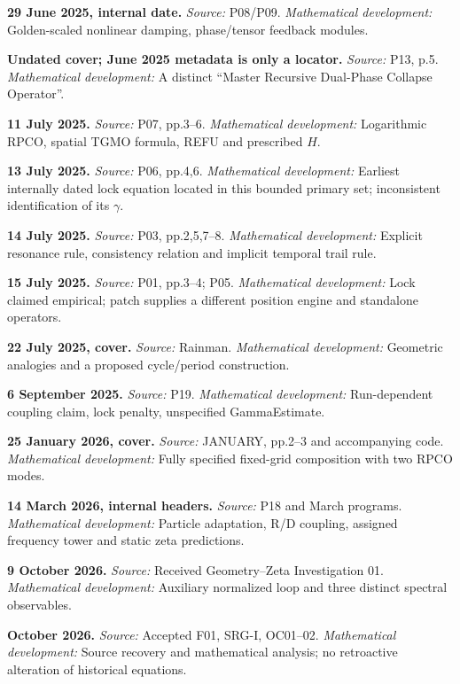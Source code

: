 \documentclass[11pt,a4paper]{article}
\begin{document}
\par\smallskip\noindent\textbf{29 June 2025, internal date.} 
\textit{Source:} P08/P09. \textit{Mathematical development:} Golden-scaled nonlinear damping, phase/tensor feedback modules.
\par\smallskip\noindent\textbf{Undated cover; June 2025 metadata is only a locator.} 
\textit{Source:} P13, p.5. \textit{Mathematical development:} A distinct ``Master Recursive Dual-Phase Collapse Operator''.
\par\smallskip\noindent\textbf{11 July 2025.} 
\textit{Source:} P07, pp.3--6. \textit{Mathematical development:} Logarithmic RPCO, spatial TGMO formula, REFU and prescribed $H$.
\par\smallskip\noindent\textbf{13 July 2025.} 
\textit{Source:} P06, pp.4,6. \textit{Mathematical development:} Earliest internally dated lock equation located in this bounded primary set; inconsistent identification of its $\gamma$.
\par\smallskip\noindent\textbf{14 July 2025.} 
\textit{Source:} P03, pp.2,5,7--8. \textit{Mathematical development:} Explicit resonance rule, consistency relation and implicit temporal trail rule.
\par\smallskip\noindent\textbf{15 July 2025.} 
\textit{Source:} P01, pp.3--4; P05. \textit{Mathematical development:} Lock claimed empirical; patch supplies a different position engine and standalone operators.
\par\smallskip\noindent\textbf{22 July 2025, cover.} 
\textit{Source:} Rainman. \textit{Mathematical development:} Geometric analogies and a proposed cycle/period construction.
\par\smallskip\noindent\textbf{6 September 2025.} 
\textit{Source:} P19. \textit{Mathematical development:} Run-dependent coupling claim, lock penalty, unspecified GammaEstimate.
\par\smallskip\noindent\textbf{25 January 2026, cover.} 
\textit{Source:} JANUARY, pp.2--3 and accompanying code. \textit{Mathematical development:} Fully specified fixed-grid composition with two RPCO modes.
\par\smallskip\noindent\textbf{14 March 2026, internal headers.} 
\textit{Source:} P18 and March programs. \textit{Mathematical development:} Particle adaptation, R/D coupling, assigned frequency tower and static zeta predictions.
\par\smallskip\noindent\textbf{9 October 2026.} 
\textit{Source:} Received Geometry--Zeta Investigation 01. \textit{Mathematical development:} Auxiliary normalized loop and three distinct spectral observables.
\par\smallskip\noindent\textbf{October 2026.} 
\textit{Source:} Accepted F01, SRG-I, OC01--02. \textit{Mathematical development:} Source recovery and mathematical analysis; no retroactive alteration of historical equations.
\end{document}
